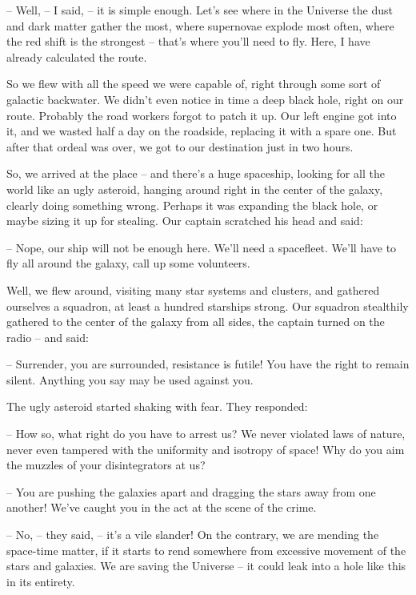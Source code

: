 \documentclass[ebook,twoside,final,openright]{memoir}
\begin{document}
– Well, – I said, – it is simple enough. Let's see where in the Universe the dust and dark matter gather the most, where supernovae explode most often, where the red shift is the strongest – that’s where you’ll need to fly. Here, I have already calculated the route.\par
So we flew with all the speed we were capable of, right through some sort of galactic backwater. We didn’t even notice in time a deep black hole, right on our route. Probably the road workers forgot to patch it up. Our left engine got into it, and we wasted half a day on the roadside, replacing it with a spare one. But after that ordeal was over, we got to our destination just in two hours.\par
\par
So, we arrived at the place – and there’s a huge spaceship, looking for all the world like an ugly asteroid, hanging around right in the center of the galaxy, clearly doing something wrong. Perhaps it was expanding the black hole, or maybe sizing it up for stealing. Our captain scratched his head and said:\par
– Nope, our ship will not be enough here. We’ll need a spacefleet. We'll have to fly all around the galaxy, call up some volunteers.\par
Well, we flew around, visiting many star systems and clusters, and gathered ourselves a squadron, at least a hundred starships strong. Our squadron stealthily gathered to the center of the galaxy from all sides, the captain turned on the radio – and said:\par
– Surrender, you are surrounded, resistance is futile! You have the right to remain silent. Anything you say may be used against you.\par
The ugly asteroid started shaking with fear. They responded:\par
– How so, what right do you have to arrest us? We never violated laws of nature, never even tampered with the uniformity and isotropy of space! Why do you aim the muzzles of your disintegrators at us?\par
– You are pushing the galaxies apart and dragging the stars away from one another! We’ve caught you in the act at the scene of the crime.\par
– No, – they said, – it’s a vile slander! On the contrary, we are mending the space-time matter, if it starts to rend somewhere from excessive movement of the stars and galaxies. We are saving the Universe – it could leak into a hole like this in its entirety.\par
\end{document}
